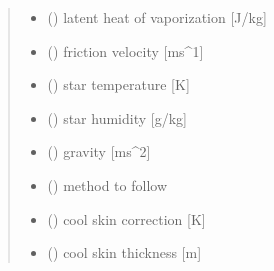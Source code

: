 \documentclass[letterpaper,10pt,english]{sphinxmanual}
\begin{document}
\begin{fulllineitems}
\begin{quote}
\begin{description}
\begin{itemize}
\item {} 
\sphinxAtStartPar
{} () \textendash{} latent heat of vaporization   {[}J/kg{]}

\item {} 
\sphinxAtStartPar
{} () \textendash{} friction velocity             {[}ms\textasciicircum{}\sphinxhyphen{}1{]}

\item {} 
\sphinxAtStartPar
{} () \textendash{} star temperature              {[}K{]}

\item {} 
\sphinxAtStartPar
{} () \textendash{} star humidity                 {[}g/kg{]}

\item {} 
\sphinxAtStartPar
{} () \textendash{} gravity                      {[}ms\textasciicircum{}\sphinxhyphen{}2{]}

\item {} 
\sphinxAtStartPar
{} () \textendash{} method to follow

\end{itemize}

\sphinxAtStartPar
\begin{itemize}
\item {} 
\sphinxAtStartPar
{} () \textendash{} cool skin correction         {[}K{]}

\item {} 
\sphinxAtStartPar
{} () \textendash{} cool skin thickness           {[}m{]}

\end{itemize}


\end{description}\end{quote}

\end{fulllineitems}

\end{document}
